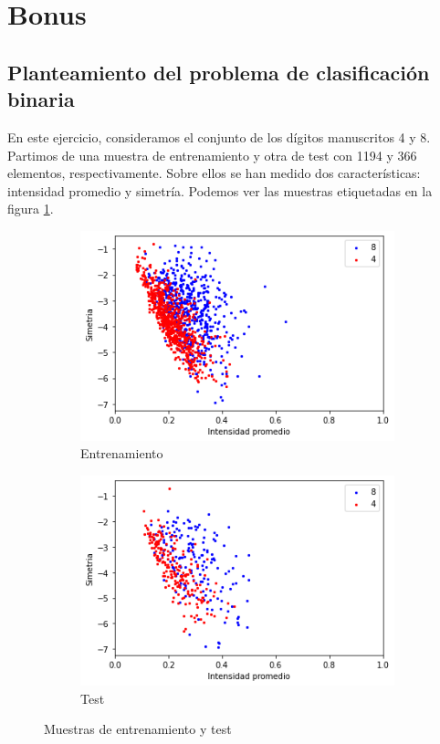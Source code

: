 \documentclass[10pt,a4paper]{article}
\begin{document}
\newpage

\section{Bonus}

\subsection{Planteamiento del problema de clasificación binaria}

En este ejercicio, consideramos el conjunto de los dígitos manuscritos 4 y 8. Partimos de una muestra de entrenamiento y otra de test con 1194 y 366 elementos, respectivamente. Sobre ellos se han medido dos características: intensidad promedio y simetría. Podemos ver las muestras etiquetadas en la figura \ref{fig:bonus_muestras}.

\begin{figure}[h]
	\begin{subfigure}{0.5\textwidth}
		\centering
		\includegraphics[width=\textwidth]{bonus_train}
		\caption{Entrenamiento}
	\end{subfigure}
	\begin{subfigure}{0.5\textwidth}
		\centering
		\includegraphics[width=\textwidth]{bonus_test}
		\caption{Test}
	\end{subfigure}
	\caption{Muestras de entrenamiento y test}
	\label{fig:bonus_muestras}
\end{figure}
\end{document}
